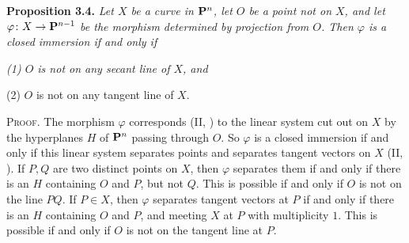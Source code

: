 {\medskip
\noindent\hypertarget{result-IV-3.4}{}\textbf{Proposition 3.4.} \emph{Let $X$ be a curve in $\mathbf{P}^n$, let $O$ be a point not on $X$, and let $\varphi\colon X\to\mathbf{P}^{n-1}$ be the morphism determined by projection from $O$. Then $\varphi$ is a closed immersion if and only if}
\par{\itshape\leftskip=11pt
\noindent\hypertarget{result-IV-3.4-1}{}(1) $O$ is not on any secant line of $X$, and

\noindent\hypertarget{result-IV-3.4-2}{}(2) $O$ is not on any tangent line of $X$.\par}

\smallskip
\noindent\textsc{Proof.} The morphism $\varphi$ corresponds (II, ) to the linear system cut out on $X$ by the hyperplanes $H$ of $\mathbf{P}^n$ passing through $O$. So $\varphi$ is a closed immersion if and only if this linear system separates points and separates tangent vectors on $X$ (II, ). If $P,Q$ are two distinct points on $X$, then $\varphi$ separates them if and only if there is an $H$ containing $O$ and $P$, but not $Q$. This is possible if and only if $O$ is not on the line $PQ$. If $P\in X$, then $\varphi$ separates tangent vectors at $P$ if and only if there is an $H$ containing $O$ and $P$, and meeting $X$ at $P$ with multiplicity $1$. This is possible if and only if $O$ is not on the tangent line at $P$.
}
